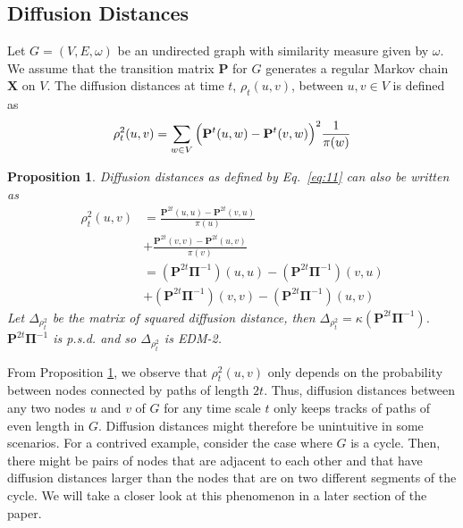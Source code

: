 \documentclass[10pt,twocolumn]{article}
\newtheorem{proposition}[theorem]{Proposition}
\numberwithin{equation}{section}
\begin{document}
\subsection{Diffusion Distances}
\label{sec:diffusion-distances}
Let $G = (V,E,\omega)$ be an undirected graph with similarity measure
given by $\omega$. We assume that the transition matrix $\mathbf{P}$
for $G$ generates a regular Markov chain $\mathbf{X}$ on $V$. The
diffusion distances at time $t$, $\rho_{t}(u,v)$, between $u,v \in V$
is defined as \cite{coifman06:_diffus_maps}
\begin{equation}
  \label{eq:11}
  \rho^{2}_{t}(u,v) = \sum_{w \in V}{\Bigl(\mathbf{P}^{t}(u,w) -
      \mathbf{P}^{t}(v,w)\Bigr)^2 \frac{1}{\pi(w)}}
\end{equation}
\begin{proposition}
  \label{prop:6}
  Diffusion distances as defined by Eq.~\eqref{eq:11} can also be
  written as
  \begin{equation*}
    \begin{split}
      \rho_{t}^{2}(u,v) &= \frac{\mathbf{P}^{2t}(u,u) -
        \mathbf{P}^{2t}(v,u)}{\pi(u)} \\ &+
      \frac{\mathbf{P}^{2t}(v,v) -
        \mathbf{P}^{2t}(u,v)}{\pi(v)}  \\
      &= (\mathbf{P}^{2t}\bm{\Pi}^{-1})(u,u) -
      (\mathbf{P}^{2t}\bm{\Pi}^{-1})(v,u) \\
      &+ (\mathbf{P}^{2t}\bm{\Pi}^{-1})(v,v) -
      (\mathbf{P}^{2t}\bm{\Pi}^{-1})(u,v)
    \end{split}
  \end{equation*}
  Let $\Delta_{\rho_t^2}$ be the matrix of squared diffusion distance,
  then $\Delta_{\rho_t^2} =
  \kappa(\mathbf{P}^{2t}\bm{\Pi}^{-1})$. 
  $\mathbf{P}^{2t}\bm{\Pi}^{-1}$ is p.s.d. and so
  $\Delta_{\rho_{t}^2}$ is EDM-2.
\end{proposition}
From Proposition \ref{prop:6}, we observe that $\rho_{t}^{2}(u,v)$
only depends on the probability between nodes connected by paths of
length $2t$. Thus, diffusion distances between any two nodes $u$ and
$v$ of $G$ for any time scale $t$ only keeps tracks of paths of even
length in $G$. Diffusion distances might therefore be unintuitive in
some scenarios. For a contrived example, consider the case where $G$
is a cycle. Then, there might be pairs of nodes that are adjacent to
each other and that have diffusion distances larger than the nodes
that are on two different segments of the cycle. We will take a closer
look at this phenomenon in a later section of the paper.  \\ \\
\end{document}
